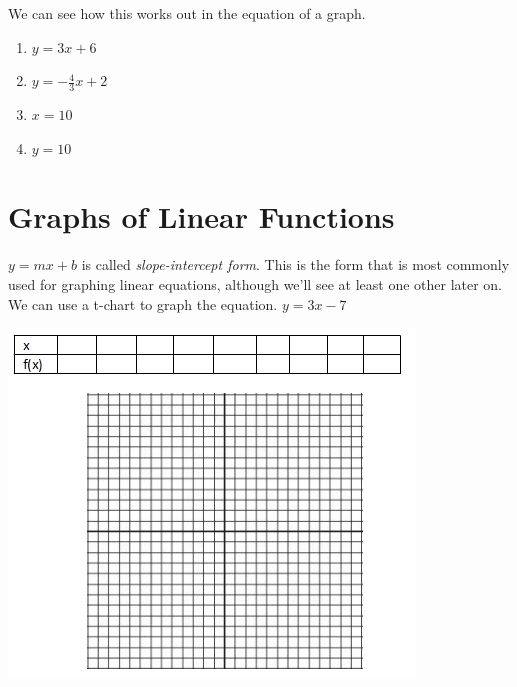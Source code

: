 \documentclass[12pt]{article}
\begin{document}
We can see how this works out in the equation of a graph.\\

\begin{enumerate}
\item $y=3x+6$\\

\item $y=-\frac{4}{3}x+2$\\

\item $x=10$\\

\item $y=10$\\
\end{enumerate}

\pagebreak

\section*{Graphs of Linear Functions}

\textbf{$y=mx+b$} is called \textit{slope-intercept form}. This is the form that is most commonly used for graphing linear equations, although we'll see at least one other later on. \\

We can use a t-chart to graph the equation. $y=3x-7$\\ 

\begin{center}

\includegraphics[scale=.9]{graphchart.jpg}

\end{center}
\end{document}
